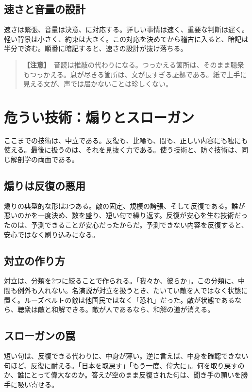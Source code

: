 \documentclass{article}
\begin{document}
\subsection{速さと音量の設計}

速さは緊張、音量は決意、に対応する。詳しい事情は速く、重要な判断は遅く。軽い背景は小さく、約束は大きく。この対応を決めてから稽古に入ると、暗記は半分で済む。順番に暗記すると、速さの設計が抜け落ちる。

\begin{quote}
\textbf{【注意】}\ 音読は推敲の代わりになる。つっかえる箇所は、そのまま聴衆もつっかえる。息が尽きる箇所は、文が長すぎる証拠である。紙で上手に見える文が、声では届かないことは珍しくない。
\end{quote}

\section{危うい技術：煽りとスローガン}

ここまでの技術は、中立である。反復も、比喩も、間も、正しい内容にも嘘にも使える。最後に扱うのは、それを見抜く力である。使う技術と、防ぐ技術は、同じ解剖学の両面である。

\subsection{煽りは反復の悪用}

煽りの典型的な形は3つある。敵の固定、規模の誇張、そして反復である。誰が悪いのかを一度決め、数を盛り、短い句で繰り返す。反復が安心を生む技術だったのは、予測できることが安心だったからだ。予測できない内容を反復すると、安心ではなく刷り込みになる。

\subsection{対立の作り方}

対立は、分類を2つに絞ることで作られる。「我々か、彼らか」。この分類に、中間も例外も入れない。名演説が対立を扱うとき、たいてい敵を人ではなく状態に置く。ルーズベルトの敵は他国民ではなく「恐れ」だった。敵が状態であるなら、聴衆は敵と和解できる。敵が人であるなら、和解の道が消える。

\subsection{スローガンの罠}

短い句は、反復できる代わりに、中身が薄い。逆に言えば、中身を確認できない句ほど、反復に耐える。「日本を取戻す」「もう一度、偉大に」。何を取り戻すのか、誰にとって偉大なのか。答えが空のまま反復された句は、聞き手の願いを勝手に吸い寄せる。
\end{document}
